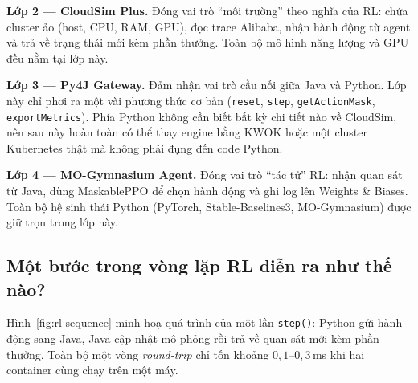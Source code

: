 \textbf{Lớp 2 --- CloudSim Plus.} Đóng vai trò ``môi trường'' theo
nghĩa của RL: chứa cluster ảo (host, CPU, RAM, GPU), đọc trace
Alibaba, nhận hành động từ agent và trả về trạng thái mới kèm phần
thưởng. Toàn bộ mô hình năng lượng và GPU đều nằm tại lớp này.

\textbf{Lớp 3 --- Py4J Gateway.} Đảm nhận vai trò cầu nối giữa Java và
Python. Lớp này chỉ phơi ra một vài phương thức cơ bản
(\texttt{reset}, \texttt{step}, \texttt{getActionMask},
\texttt{exportMetrics}). Phía Python không cần biết bất kỳ chi tiết
nào về CloudSim, nên sau này hoàn toàn có thể thay engine bằng KWOK
hoặc một cluster Kubernetes thật mà không phải đụng đến code Python.

\textbf{Lớp 4 --- MO-Gymnasium Agent.} Đóng vai trò ``tác tử'' RL:
nhận quan sát từ Java, dùng MaskablePPO để chọn hành động và ghi log
lên Weights \& Biases. Toàn bộ hệ sinh thái Python (PyTorch,
Stable-Baselines3, MO-Gymnasium) được giữ trọn trong lớp này.

\subsection{Một bước trong vòng lặp RL diễn ra như thế nào?}
Hình~\ref{fig:rl-sequence} minh hoạ quá trình của một lần
\texttt{step()}: Python gửi hành động sang Java, Java cập nhật mô
phỏng rồi trả về quan sát mới kèm phần thưởng. Toàn bộ một vòng
\emph{round-trip} chỉ tốn khoảng $0{,}1$--$0{,}3$\,ms khi hai
container cùng chạy trên một máy.

